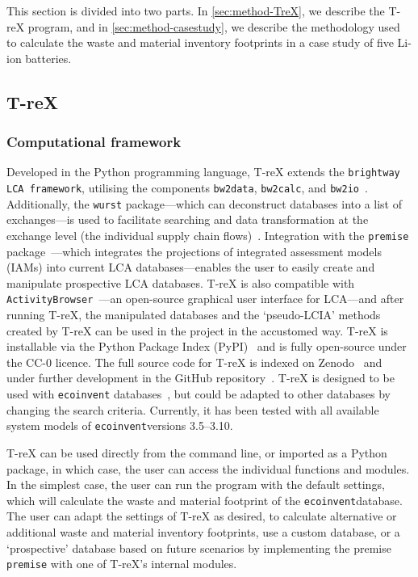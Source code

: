 This section is divided into two parts. In \autoref{sec:method-TreX}, we describe the T-reX program, and in \autoref{sec:method-casestudy}, we describe the methodology used to calculate the waste and material inventory footprints in a case study of five Li-ion batteries.

\subsection{T-reX}\label{sec:method-TreX}

\subsubsection{Computational framework}

Developed in the Python programming language, T-reX extends the \texttt{brightway LCA framework}, utilising the components \texttt{bw2data}, \texttt{bw2calc}, and \texttt{bw2io}~\citep{mutel2017brightway}. Additionally, the \texttt{wurst} package---which can deconstruct databases into a list of exchanges---is used to facilitate searching and data transformation at the exchange level (the individual supply chain flows)~\citep{mutel2017wurst}. Integration with the \texttt{premise} package~\citep{sacchi2022premise}---which integrates the projections of integrated assessment models (IAMs) into current LCA databases---enables the user to easily create and manipulate prospective LCA databases. T-reX is also compatible with \texttt{ActivityBrowser}~\citep{steubing2020activitybrowser}---an open-source graphical user interface for LCA---and after running T-reX, the manipulated databases and the `pseudo-LCIA' methods created by T-reX can be used in the project in the accustomed way. T-reX is installable via the Python Package Index (PyPI)~\citep{mcdowall2023T-reXpipy} and is fully open-source under the CC-0 licence. The full source code for T-reX is indexed on Zenodo~\citep{mcdowall2023T-reXzenodo} and under further development in the GitHub repository~\citep{mcdowall2024T-reXgithub}. T-reX is designed to be used with \texttt{ecoinvent} databases~\citep{ecoinvent2016version3}, but could be adapted to other databases by changing the search criteria. Currently, it has been tested with all available system models of \texttt{ecoinvent}versions 3.5--3.10.

T-reX can be used directly from the command line, or imported as a Python package, in which case, the user can access the individual functions and modules. In the simplest case, the user can run the program with the default settings, which will calculate the waste and material footprint of the \texttt{ecoinvent}database. The user can adapt the settings of T-reX as desired, to calculate alternative or additional waste and material inventory footprints, use a custom database, or a `prospective' database based on future scenarios by implementing the premise \texttt{premise} with one of T-reX's internal modules.

